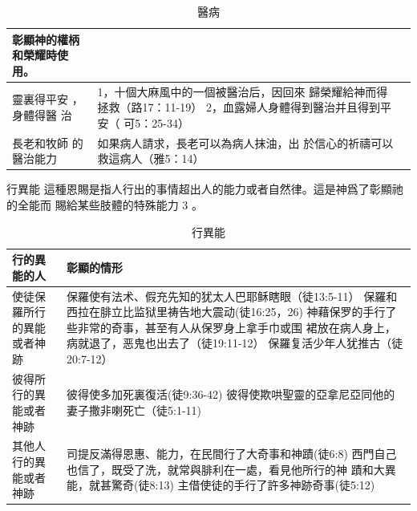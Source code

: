 \begin{table}[htbp]
\begin{tabular}{p{15.145em}|p{15.785em}|p{16.5em}}
彰顯神的權柄和榮耀時使用。\\    \midrule

靈裏得平安
，身體得醫
治&

1，十個大麻風中的一個被醫治后，因回來
歸榮耀給神而得拯救（路17：11-19）
2，血露婦人身體得到醫治并且得到平安（
可5：25-34）&\\    \midrule

長老和牧師
的醫治能力&

如果病人請求，長老可以為病人抹油，出
於信心的祈禱可以救這病人（雅5：14）&

\\    \bottomrule
    \end{tabular}%
     \caption{醫病}
  \label{tab:addlabel}%
\end{table}%


行異能
這種恩賜是指人行出的事情超出人的能力或者自然律。這是神爲了彰顯祂的全能而
賜給某些肢體的特殊能力 3 。
\begin{table}[H]
  \centering
    \begin{tabular}{p{20.145em}|p{23.785em}}    \toprule
\multicolumn{1}{p{20.215em}|}{\textbf{行的異能的人}} & \multicolumn{1}{p{23.215em}}{\textbf{彰顯的情形}}  \\    \midrule

使徒保羅所行
的異能或者神
跡&保羅使有法术、假充先知的犹太人巴耶稣瞎眼（徒13:5-11）
保羅和西拉在腓立比监狱里祷告地大震动(徒16:25，26)
神藉保罗的手行了些非常的奇事，甚至有人从保罗身上拿手巾或围
裙放在病人身上，病就退了，恶鬼也出去了（徒19:11-12）
保羅复活少年人犹推古（徒20:7-12）\\    \midrule

彼得所行的異
能或者神跡&彼得使多加死裏復活(徒9:36-42)
彼得使欺哄聖靈的亞拿尼亞同他的妻子撒非喇死亡（徒5:1-11)\\    \midrule

其他人行的異
能或者神跡&司提反滿得恩惠、能力，在民間行了大奇事和神蹟(徒6:8)
西門自己也信了，既受了洗，就常與腓利在一處，看見他所行的神
蹟和大異能，就甚驚奇(徒8:13)
主借使徒的手行了許多神跡奇事(徒5:12)
\\    \bottomrule
    \end{tabular}%
     \caption{行異能}
  \label{tab:addlabel}%
\end{table}%





